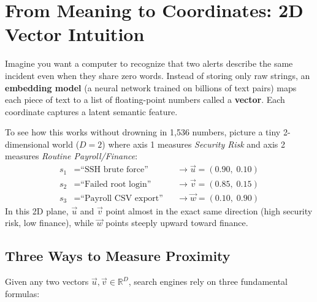 \section{From Meaning to Coordinates: 2D Vector Intuition}

Imagine you want a computer to recognize that two alerts describe the same incident even when they share zero words. Instead of storing only raw strings, an \textbf{embedding model} (a neural network trained on billions of text pairs) maps each piece of text to a list of floating-point numbers called a \textbf{vector}. Each coordinate captures a latent semantic feature.

To see how this works without drowning in 1,536 numbers, picture a tiny 2-dimensional world ($D = 2$) where axis 1 measures \emph{Security Risk} and axis 2 measures \emph{Routine Payroll/Finance}:
\begin{align*}
s_1 &= \text{``SSH brute force''}      &&\longrightarrow \vec{u} = (0.90,\; 0.10) \\
s_2 &= \text{``Failed root login''}    &&\longrightarrow \vec{v} = (0.85,\; 0.15) \\
s_3 &= \text{``Payroll CSV export''}   &&\longrightarrow \vec{w} = (0.10,\; 0.90)
\end{align*}
In this 2D plane, $\vec{u}$ and $\vec{v}$ point almost in the exact same direction (high security risk, low finance), while $\vec{w}$ points steeply upward toward finance.

\subsection{Three Ways to Measure Proximity}
Given any two vectors $\vec{u}, \vec{v} \in \mathbb{R}^D$, search engines rely on three fundamental formulas:

